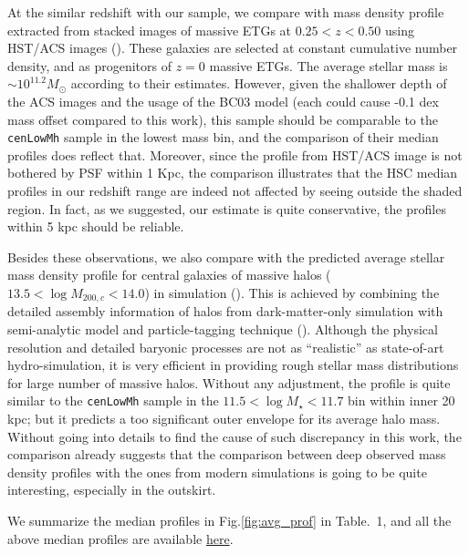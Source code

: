 \documentclass{emulateapj}
\def\nbcg{\texttt{cenLowMh}}
\begin{document}
\begin{CJK*}{UTF8}{gbsn}
    At the similar redshift with our sample, we compare with mass density 
    profile extracted from stacked images of massive ETGs at $0.25 < z < 0.50$ 
    using HST/ACS images (\citealt{Patel2013}).  
    These galaxies are selected at constant cumulative number density, and 
    as progenitors of $z=0$ massive ETGs.  
    The average stellar mass is $\sim 10^{11.2} M_{\odot}$ according to 
    their estimates.  
    However, given the shallower depth of the ACS images and the usage of the 
    BC03 model (each could cause -0.1 dex mass offset compared to this work), 
    this sample should be comparable to the \nbcg{} sample in the
    lowest mass bin, and the comparison of their median profiles does reflect
    that.  
    Moreover, since the profile from HST/ACS image is not bothered by PSF 
    within 1 Kpc, the comparison illustrates that the HSC median profiles 
    in our redshift range are indeed not affected by seeing outside the 
    shaded region. 
    In fact, as we suggested, our estimate is quite conservative, the profiles 
    within 5 kpc should be reliable. 
  
    Besides these observations, we also compare with the predicted average 
    stellar mass density profile for central galaxies of massive halos 
    ($13.5 < \log M_{200,c} < 14.0$) in simulation (\citealt{Cooper13}). 
    This is achieved by combining the detailed assembly information of halos 
    from dark-matter-only simulation with semi-analytic model and 
    particle-tagging technique (\citealt{Cooper10}).
    Although the physical resolution and detailed baryonic processes are 
    not as ``realistic'' as state-of-art hydro-simulation, it is very 
    efficient in providing rough stellar mass distributions for large number 
    of massive halos. 
    Without any adjustment, the profile is quite similar to the \nbcg{}
    sample in the $11.5 < \log M_{\star} < 11.7$ bin within inner 20 kpc; 
    but it predicts a too significant outer envelope for its average halo mass.
    Without going into details to find the cause of such discrepancy in this 
    work, the comparison already suggests that the comparison between deep 
    observed mass density profiles with the ones from modern simulations is 
    going to be quite interesting, especially in the outskirt. 
    
    We summarize the median profiles in Fig.\ref{fig:avg_prof} in Table.~1,
    and all the above median profiles are available  
    \href{https://github.com/dr-guangtou/hsc_cenHighMh/tree/master/profiles}{here}.


\end{CJK*}
\end{document}
